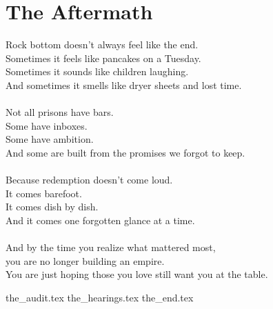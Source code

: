 \part{The Aftermath}

\vfill

\begin{flushright}
    \Large
    Rock bottom doesn’t always feel like the end.\\
    Sometimes it feels like pancakes on a Tuesday.\\
    Sometimes it sounds like children laughing.\\
    And sometimes it smells like dryer sheets and lost time.\\
    \ \\
    Not all prisons have bars.\\
    Some have inboxes.\\
    Some have ambition.\\
    And some are built from the promises we forgot to keep.\\
    \ \\
    Because redemption doesn’t come loud.\\
    It comes barefoot.\\
    It comes dish by dish.\\
    And it comes one forgotten glance at a time.\\
    \ \\
    And by the time you realize what mattered most,\\
    you are no longer building an empire.\\
    You are just hoping those you love still want you at the table.\\
\end{flushright}

{the_audit.tex}
{the_hearings.tex}
{the_end.tex}